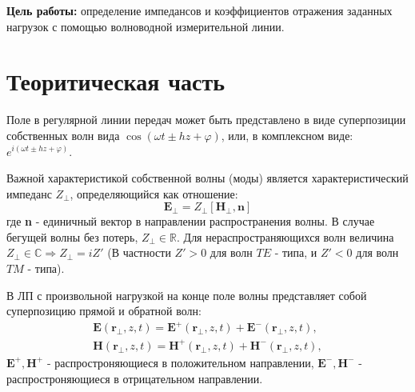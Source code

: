 



\def\labauthors{Виноградов И.Д., Шиков А.П.}
\def\labgroup{430}
\def\labnumber{7}
\def\labtheme{Измерение импедансов и коэффициентов отражения}


\newpage

{\bfseries Цель работы:} 
определение импедансов и коэффициентов отражения заданных нагрузок с помощью волноводной измерительной линии.

\section{Теоритическая часть}

Поле в регулярной линии передач может быть представлено в виде суперпозиции собственных волн вида $ \cos (\omega t \pm h
z + \varphi) $, или, в комплексном виде: $e^{ i ( \omega t \pm h z +\varphi ) }$. 

Важной характеристикой собственной волны (моды) является характеристический импеданс $Z_{\bot}$, определяющийся как отношение:
\begin{equation}
     \textbf{E}_{\bot} = Z_{\bot}[ \textbf{H}_{\bot},\textbf{n} ]
    \label{eq:1}
\end{equation}
где \textbf{n} - единичный вектор в направлении распространения волны. В случае бегущей волны без потерь, $Z_{\bot} \in
\mathds{R} $. Для нераспространяющихся волн величина $Z_{\bot} \in \mathds{C} \Rightarrow Z_{\bot} = iZ'$ (В частности
$Z'>0$ для волн $TE$ - типа, и $Z'<0$ для волн $TM$ - типа). 

В ЛП с произвольной нагрузкой на конце поле волны представляет собой суперпозицию прямой и обратной волн:
\begin{equation}
    \begin{split}
        \textbf{E}(\textbf{r}_{\bot},z,t) = \textbf{E}^+(\textbf{r}_{\bot},z,t)+\textbf{E}^-(\textbf{r}_{\bot},z,t),\\
        \textbf{H}(\textbf{r}_{\bot},z,t) = \textbf{H}^+(\textbf{r}_{\bot},z,t)+\textbf{H}^-(\textbf{r}_{\bot},z,t),  
    \end{split}
    \label{eq:2}
\end{equation}
$\textbf{E}^+,\textbf{H}^+$ - распростроняющиеся в положительном направлении, $\textbf{E}^-,\textbf{H}^-$ -
распростроняющиеся в отрицательном направлении.

